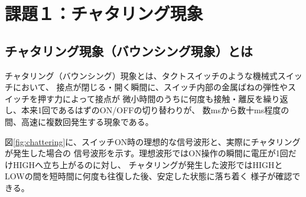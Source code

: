 \documentclass[12pt,a4paper]{ltjsarticle}
\begin{document}
\section{課題１：チャタリング現象}\label{sec:task1}

\subsection{チャタリング現象（バウンシング現象）とは}\label{sec:task1-explanation}

チャタリング（バウンシング）現象とは、タクトスイッチのような機械式スイッチにおいて、
接点が閉じる・開く瞬間に、スイッチ内部の金属ばねの弾性やスイッチを押す力によって接点が
微小時間のうちに何度も接触・離反を繰り返し、本来1回であるはずのON/OFFの切り替わりが、
数msから数十ms程度の間、高速に複数回発生する現象である。

図\ref{fig:chattering}に、スイッチON時の理想的な信号波形と、実際にチャタリングが発生した場合の
信号波形を示す。理想波形ではON操作の瞬間に電圧が1回だけHIGHへ立ち上がるのに対し、
チャタリングが発生した波形ではHIGHとLOWの間を短時間に何度も往復した後、安定した状態に落ち着く
様子が確認できる。
\end{document}
